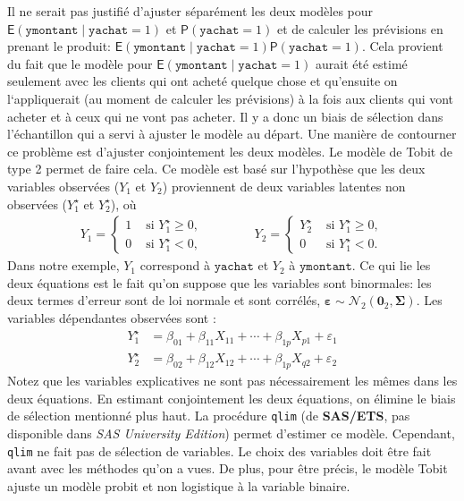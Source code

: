 \documentclass[
  11pt,
  letterpaper,
]{book}
\theoremstyle{definition}
\theoremstyle{definition}
\theoremstyle{definition}
\theoremstyle{remark}
\begin{document}
Il ne serait pas justifié d'ajuster séparément les deux modèles pour \({\mathsf E}\left(\texttt{ymontant} \mid \texttt{yachat}=1\right)\) et \({\mathsf P}\left(\texttt{yachat}=1\right)\) et de calculer les prévisions en prenant le produit: \({\mathsf E}\left(\texttt{ymontant} \mid \texttt{yachat}=1\right){\mathsf P}\left(\texttt{yachat}=1\right)\). Cela provient du fait que le modèle pour \({\mathsf E}\left(\texttt{ymontant} \mid \texttt{yachat}=1\right)\) aurait été estimé seulement avec les clients qui ont acheté quelque chose et qu'ensuite on l`appliquerait (au moment de calculer les prévisions) à la fois aux clients qui vont acheter et à ceux qui ne vont pas acheter. Il y a donc un biais de sélection dans l'échantillon qui a servi à ajuster le modèle au départ. Une manière de contourner ce problème est d'ajuster conjointement les deux modèles. Le modèle de Tobit de type 2 permet de faire cela. Ce modèle est basé sur l'hypothèse que les deux variables observées (\(Y_1\) et \(Y_2\)) proviennent de deux variables latentes non observées (\(Y_1^{\star}\) et \(Y_2^{\star}\)), où
\begin{align*}
Y_1 = \begin{cases}
1 & \text{ si } Y_1^{\star} \ge 0, \\
0 & \text{ si } Y_1^{\star} < 0,
\end{cases}
\qquad \qquad 
Y_2 = \begin{cases}
Y_2^{\star} & \text{ si } Y_1^{\star} \ge 0, \\
0 & \text{ si } Y_1^{\star} < 0.
\end{cases}
\end{align*}
Dans notre exemple, \(Y_1\) correspond à \(\texttt{yachat}\) et \(Y_2\) à \(\texttt{ymontant}\).
Ce qui lie les deux équations est le fait qu'on suppose que les variables sont binormales: les deux termes d'erreur sont de loi normale et sont corrélés, \(\boldsymbol{\varepsilon} \sim \mathcal{N}_2(\boldsymbol{0}_2, \boldsymbol{\Sigma})\). Les variables dépendantes observées sont :
\begin{align*}
Y_{1}^{\star} &= \beta_{01} + \beta_{11} X_{11} + \cdots + \beta_{1p}X_{p1} + \varepsilon_{1}\\
Y_{2}^{\star} &= \beta_{02} + \beta_{12} X_{12} + \cdots + \beta_{1p}X_{q2} + \varepsilon_{2}
\end{align*}
Notez que les variables explicatives ne sont pas nécessairement les mêmes dans les deux équations. En estimant conjointement les deux équations, on élimine le biais de sélection mentionné plus haut. La procédure \texttt{qlim} (de \textbf{SAS/ETS}, pas disponible dans \emph{SAS University Edition}) permet d'estimer ce modèle. Cependant, \texttt{qlim} ne fait pas de sélection de variables. Le choix des variables doit être fait avant avec les méthodes qu'on a vues. De plus, pour être précis, le modèle Tobit ajuste un modèle probit et non logistique à la variable binaire.
\end{document}
